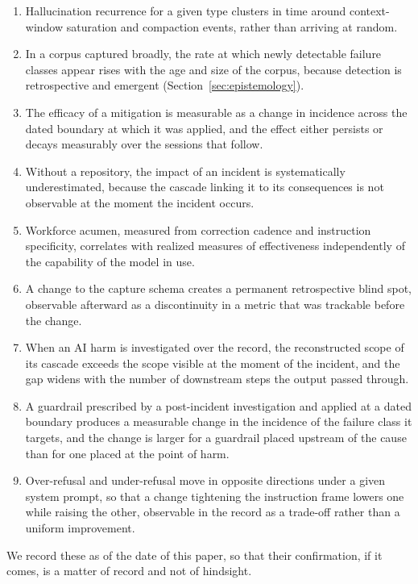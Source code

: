 \documentclass[11pt]{article}
\begin{document}
\begin{enumerate}
\item Hallucination recurrence for a given type clusters in time around
context-window saturation and compaction events, rather than arriving at random.
\item In a corpus captured broadly, the rate at which newly detectable failure
classes appear rises with the age and size of the corpus, because detection is
retrospective and emergent (Section~\ref{sec:epistemology}).
\item The efficacy of a mitigation is measurable as a change in incidence across
the dated boundary at which it was applied, and the effect either persists or
decays measurably over the sessions that follow.
\item Without a repository, the impact of an incident is systematically
underestimated, because the cascade linking it to its consequences is not
observable at the moment the incident occurs.
\item Workforce acumen, measured from correction cadence and instruction
specificity, correlates with realized measures of effectiveness independently of
the capability of the model in use.
\item A change to the capture schema creates a permanent retrospective blind spot,
observable afterward as a discontinuity in a metric that was trackable before the
change.
\item When an AI harm is investigated over the record, the reconstructed scope of
its cascade exceeds the scope visible at the moment of the incident, and the gap
widens with the number of downstream steps the output passed through.
\item A guardrail prescribed by a post-incident investigation and applied at a
dated boundary produces a measurable change in the incidence of the failure class
it targets, and the change is larger for a guardrail placed upstream of the cause
than for one placed at the point of harm.
\item Over-refusal and under-refusal move in opposite directions under a given
system prompt, so that a change tightening the instruction frame lowers one while
raising the other, observable in the record as a trade-off rather than a uniform
improvement.
\end{enumerate}

We record these as of the date of this paper, so that their confirmation, if it
comes, is a matter of record and not of hindsight.

\end{document}
